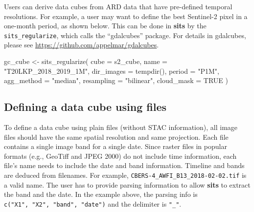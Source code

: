 \documentclass[a4paper,]{tufte-book}
\newenvironment{Shaded}{}{}
\newcommand{\AttributeTok}[1]{\textcolor[rgb]{0.49,0.56,0.16}{#1}}
\newcommand{\ConstantTok}[1]{\textcolor[rgb]{0.53,0.00,0.00}{#1}}
\newcommand{\FunctionTok}[1]{\textcolor[rgb]{0.02,0.16,0.49}{#1}}
\newcommand{\NormalTok}[1]{#1}
\newcommand{\OtherTok}[1]{\textcolor[rgb]{0.00,0.44,0.13}{#1}}
\newcommand{\StringTok}[1]{\textcolor[rgb]{0.25,0.44,0.63}{#1}}
\begin{document}
Users can derive data cubes from ARD data that have pre-defined temporal resolutions. For example, a user may want to define the best Sentinel-2 pixel in a one-month period, as shown below. This can be done in \textbf{sits} by the \texttt{sits\_regularize}, which calls the ``gdalcubes'' package.
For details in gdalcubes, please see \url{https://github.com/appelmar/gdalcubes}.

\begin{Shaded}
\begin{Highlighting}[]
\NormalTok{gc\_cube }\OtherTok{\textless{}{-}} \FunctionTok{sits\_regularize}\NormalTok{(}
          \AttributeTok{cube       =}\NormalTok{ s2\_cube,}
          \AttributeTok{name       =} \StringTok{"T20LKP\_2018\_2019\_1M"}\NormalTok{,}
          \AttributeTok{dir\_images =} \FunctionTok{tempdir}\NormalTok{(),}
          \AttributeTok{period     =} \StringTok{"P1M"}\NormalTok{,}
          \AttributeTok{agg\_method =} \StringTok{"median"}\NormalTok{,}
          \AttributeTok{resampling =} \StringTok{"bilinear"}\NormalTok{,}
          \AttributeTok{cloud\_mask =} \ConstantTok{TRUE}
\NormalTok{)}
\end{Highlighting}
\end{Shaded}

\hypertarget{defining-a-data-cube-using-files-1}{%
\subsection{Defining a data cube using files}\label{defining-a-data-cube-using-files-1}}

To define a data cube using plain files (without STAC information), all image files should have the same spatial resolution and same projection. Each file contains a single image band for a single date. Since raster files in popular formats (e.g., GeoTiff and JPEG 2000) do not include time information, each file's name needs to include the date and band information. Timeline and bands are deduced from filenames. For example, \texttt{CBERS-4\_AWFI\_B13\_2018-02-02.tif} is a valid name. The user has to provide parsing information to allow \textbf{sits} to extract the band and the date. In the example above, the parsing info is \texttt{c("X1",\ "X2",\ "band",\ "date")} and the delimiter is \texttt{"\_"}.
\end{document}
